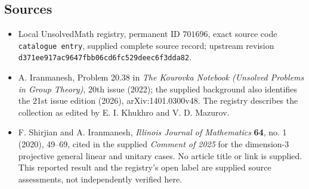\documentclass[11pt]{article}
\begin{document}
\subsection{Sources}
\begin{itemize}
\item Local UnsolvedMath registry, permanent ID \(701696\), exact source code \texttt{catalogue entry}, supplied complete source record; upstream revision \texttt{d371ee917ac9647fbb06cd6fc529deec6f3dda82}.
\item A. Iranmanesh, Problem 20.38 in \emph{The Kourovka Notebook (Unsolved Problems in Group Theory)}, 20th issue (2022); the supplied background also identifies the 21st issue edition (2026), arXiv:1401.0300v48. The registry describes the collection as edited by E. I. Khukhro and V. D. Mazurov.
\item F. Shirjian and A. Iranmanesh, \emph{Illinois Journal of Mathematics} \textbf{64}, no. 1 (2020), 49--69, cited in the supplied \emph{Comment of 2025} for the dimension-\(3\) projective general linear and unitary cases. No article title or link is supplied. This reported result and the registry's open label are supplied source assessments, not independently verified here.
\end{itemize}
\end{document}
